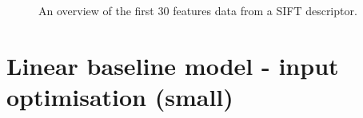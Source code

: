 \begin{figure}[H]
    \captionsetup{width=0.85\linewidth}
    \captionsetup{justification=centering}
    \caption{An overview of the first 30 features data from a SIFT descriptor.}
    \label{fig:1-data_analysis-feature_representation}
\end{figure}


\section*{Linear baseline model - input optimisation (small)}

